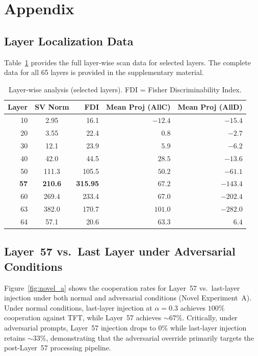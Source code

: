 \documentclass{article}
\begin{document}

\newpage
\appendix
\section{Appendix}
\label{sec:appendix}

\subsection{Layer Localization Data}
\label{sec:app_layer}

Table~\ref{tab:layer_data} provides the full layer-wise scan data for selected layers. The complete data for all 65 layers is provided in the supplementary material.

\begin{table}[h]
\centering
\caption{Layer-wise analysis (selected layers). FDI = Fisher Discriminability Index.}
\label{tab:layer_data}
\small
\begin{tabular}{rcrrr}
\toprule
\textbf{Layer} & \textbf{SV Norm} & \textbf{FDI} & \textbf{Mean Proj (AllC)} & \textbf{Mean Proj (AllD)} \\
\midrule
10 & 2.95 & 16.1 & $-12.4$ & $-15.4$ \\
20 & 3.55 & 22.4 & $0.8$ & $-2.7$ \\
30 & 12.1 & 23.9 & $5.9$ & $-6.2$ \\
40 & 42.0 & 44.5 & $28.5$ & $-13.6$ \\
50 & 111.3 & 105.5 & $50.2$ & $-61.1$ \\
\textbf{57} & \textbf{210.6} & \textbf{315.95} & $\mathbf{67.2}$ & $\mathbf{-143.4}$ \\
60 & 269.4 & 233.4 & $67.0$ & $-202.4$ \\
63 & 382.0 & 170.7 & $101.0$ & $-282.0$ \\
64 & 57.1 & 20.6 & $63.3$ & $6.4$ \\
\bottomrule
\end{tabular}
\end{table}

\subsection{Layer~57 vs.\ Last Layer under Adversarial Conditions}
\label{sec:app_layer57}

Figure~\ref{fig:novel_a} shows the cooperation rates for Layer~57 vs.\ last-layer injection under both normal and adversarial conditions (Novel Experiment~A). Under normal conditions, last-layer injection at $\alpha = 0.3$ achieves $100\%$ cooperation against TFT, while Layer~57 achieves $\sim 67\%$. Critically, under adversarial prompts, Layer~57 injection drops to $0\%$ while last-layer injection retains $\sim 33\%$, demonstrating that the adversarial override primarily targets the post-Layer~57 processing pipeline.
\end{document}
